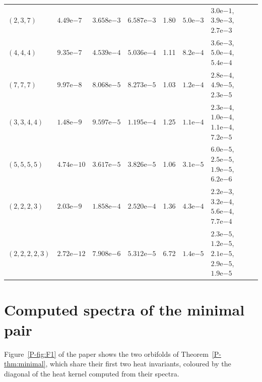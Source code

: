 \documentclass[pdflatex,sn-mathphys-num]{sn-jnl}
\newcommand{\pref}[1]{\ref*{P-#1}}%
\theoremstyle{thmstyleone}%
\theoremstyle{thmstylethree}%
\begin{document}
\begin{table}[ht]
\begin{tabular}{@{}llllrl>{\raggedright\arraybackslash}p{30mm}@{}}
$(2,3,7)$ & $4.49\text{e}{-7}$ & $3.658\text{e}{-3}$ & $6.587\text{e}{-3}$ & 1.80 & $5.0\text{e}{-3}$ & $3.0\text{e}{-1}$, $3.9\text{e}{-3}$, $2.7\text{e}{-3}$ \\
$(4,4,4)$ & $9.35\text{e}{-7}$ & $4.539\text{e}{-4}$ & $5.036\text{e}{-4}$ & 1.11 & $8.2\text{e}{-4}$ & $3.6\text{e}{-3}$, $5.0\text{e}{-4}$, $5.4\text{e}{-4}$ \\
$(7,7,7)$ & $9.97\text{e}{-8}$ & $8.068\text{e}{-5}$ & $8.273\text{e}{-5}$ & 1.03 & $1.2\text{e}{-4}$ & $2.8\text{e}{-4}$, $4.9\text{e}{-5}$, $2.3\text{e}{-5}$ \\
$(3,3,4,4)$ & $1.48\text{e}{-9}$ & $9.597\text{e}{-5}$ & $1.195\text{e}{-4}$ & 1.25 & $1.1\text{e}{-4}$ & $2.3\text{e}{-4}$, $1.0\text{e}{-4}$, $1.1\text{e}{-4}$, $7.2\text{e}{-5}$ \\
$(5,5,5,5)$ & $4.74\text{e}{-10}$ & $3.617\text{e}{-5}$ & $3.826\text{e}{-5}$ & 1.06 & $3.1\text{e}{-5}$ & $6.0\text{e}{-5}$, $2.5\text{e}{-5}$, $1.9\text{e}{-5}$, $6.2\text{e}{-6}$ \\
$(2,2,2,3)$ & $2.03\text{e}{-9}$ & $1.858\text{e}{-4}$ & $2.520\text{e}{-4}$ & 1.36 & $4.3\text{e}{-4}$ & $2.2\text{e}{-3}$, $3.2\text{e}{-4}$, $5.6\text{e}{-4}$, $7.7\text{e}{-4}$ \\
$(2,2,2,2,3)$ & $2.72\text{e}{-12}$ & $7.908\text{e}{-6}$ & $5.312\text{e}{-5}$ & 6.72 & $1.4\text{e}{-5}$ & $2.3\text{e}{-5}$, $1.2\text{e}{-5}$, $2.1\text{e}{-5}$, $2.9\text{e}{-5}$, $1.9\text{e}{-5}$ \\
\bottomrule
\end{tabular}
\end{table}

\section{Computed spectra of the minimal pair}\label{sec:listening}

Figure~\pref{fig:F1} of the paper shows the two orbifolds of Theorem~\pref{thm:minimal}, which share their first two heat invariants, coloured by the diagonal of the heat kernel computed from their spectra.
\end{document}
